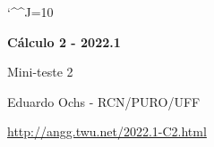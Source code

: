 \documentclass[oneside,12pt]{article}
\begin{document}
\catcode`\^^J=10
\pu
\def\pictgridstyle{\color{GrayPale}\linethickness{0.3pt}}
\def\pictaxesstyle{\linethickness{0.5pt}}
\celllower=2.5pt


\def\u#1{\par{\footnotesize \url{#1}}}

\def\drafturl{http://angg.twu.net/LATEX/2022-1-C2.pdf}
\def\drafturl{http://angg.twu.net/2022.1-C2.html}
\def\draftfooter{\tiny \href{\drafturl}{\jobname{}} \ColorBrown{\shorttoday{} \hours}}




%

\thispagestyle{empty}

\begin{center}

\vspace*{1.2cm}

{\bf \Large Cálculo 2 - 2022.1}

\bsk

Mini-teste 2

\bsk

Eduardo Ochs - RCN/PURO/UFF

\url{http://angg.twu.net/2022.1-C2.html}

\end{center}

\newpage

\end{document}
